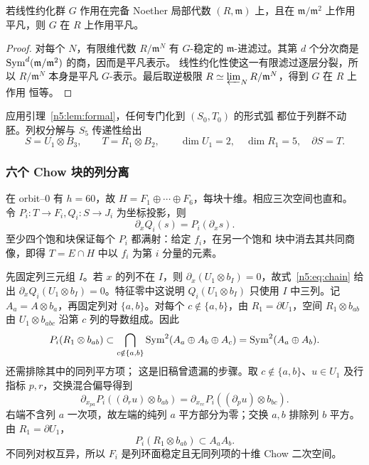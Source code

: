 \begin{lemma}[形式线性化]\label{n5:lem:formal}
若线性约化群 \(G\) 作用在完备 Noether 局部代数
\((R,\mathfrak m)\) 上，且在 \(\mathfrak m/\mathfrak m^2\) 上作用
平凡，则 \(G\) 在 \(R\) 上作用平凡。
\end{lemma}
\begin{proof}
对每个 \(N\)，有限维代数 \(R/\mathfrak m^N\) 有 \(G\)-稳定的
\(\mathfrak m\)-进滤过。其第 \(d\) 个分次商是
\(\operatorname{Sym}^d(\mathfrak m/\mathfrak m^2)\) 的商，因而是平凡表示。
线性约化性使这一有限滤过逐层分裂，所以
\(R/\mathfrak m^N\) 本身是平凡 \(G\)-表示。最后取逆极限
\(R\simeq\varprojlim_N R/\mathfrak m^N\)，得到 \(G\) 在 \(R\) 上作用
恒等。
\end{proof}

应用引理~\ref{n5:lem:formal}，任何专门化到 \((S_0,T_0)\) 的形式弧
都位于列群不动胚。列权分解与 \(S_5\) 传递性给出
\begin{equation}\label{n5:eq:tensorflag}
 S=U_1\otimes B_3,\qquad T=R_1\otimes B_2,\qquad
 \dim U_1=2,\quad\dim R_1=5,\quad\partial S=T.
\end{equation}

\subsubsection{六个 Chow 块的列分离}

在 orbit--0 有 \(h=60\)，故
\(H=F_1\oplus\cdots\oplus F_6\)，每块十维。相应三次空间也直和。
令 \(P_i:T\to F_i,Q_i:S\to J_i\) 为坐标投影，则
\begin{equation}\label{n5:eq:chain}
 \partial_xQ_i(s)=P_i(\partial_xs).
\end{equation}
至少四个饱和块保证每个 \(P_i\) 都满射：给定 \(f_i\)，在另一个饱和
块中消去其共同商像，即得 \(T=E\cap H\) 中以 \(f_i\) 为第 \(i\)
分量的元素。

先固定列三元组 \(I\)。若 \(x\) 的列不在 \(I\)，则
\(\partial_x(U_1\otimes b_I)=0\)，故式~\eqref{n5:eq:chain} 给出
\(\partial_xQ_i(U_1\otimes b_I)=0\)。特征零中这说明
\(Q_i(U_1\otimes b_I)\) 只使用 \(I\) 中三列。记
\(A_a=A\otimes b_a\)，再固定列对
\(\{a,b\}\)。对每个 \(c\notin\{a,b\}\)，由
\(R_1=\partial U_1\)，空间 \(R_1\otimes b_{ab}\) 由
\(U_1\otimes b_{abc}\) 沿第 \(c\) 列的导数组成。因此
\[
P_i(R_1\otimes b_{ab})
\subset\bigcap_{c\notin\{a,b\}}
\operatorname{Sym}^2(A_a\oplus A_b\oplus A_c)
=\operatorname{Sym}^2(A_a\oplus A_b).
\]
还需排除其中的同列平方项；
这是旧稿曾遗漏的步骤。取 \(c\notin\{a,b\}\)、\(u\in U_1\) 及行指标
\(p,r\)，交换混合偏导得到
\begin{equation}\label{n5:eq:mixed}
 \partial_{x_{pa}}P_i((\partial_ru)\otimes b_{ab})
 =\partial_{x_{rc}}P_i((\partial_pu)\otimes b_{bc}).
\end{equation}
右端不含列 \(a\) 一次项，故左端的纯列 \(a\) 平方部分为零；交换
\(a,b\) 排除列 \(b\) 平方。由 \(R_1=\partial U_1\)，
\[
 P_i(R_1\otimes b_{ab})\subset A_aA_b.
\]
不同列对权互异，所以 \(F_i\) 是列环面稳定且无同列项的十维 Chow
二次空间。

